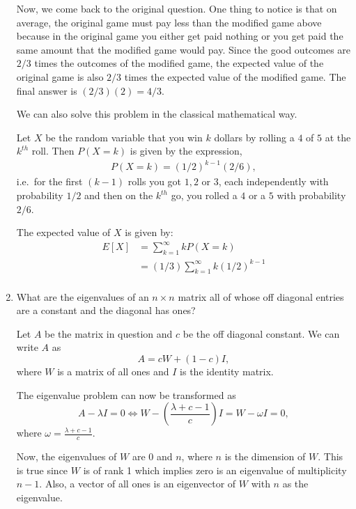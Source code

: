 \documentclass{amsart}
\theoremstyle{plain}
\numberwithin{equation}{section}
\begin{document}
\begin{enumerate}
Now, we come back to the original question. One thing to notice is
that on average, the original game must pay less than the modified 
game above because in the original game you either get paid nothing 
or you get paid the same amount that the modified game would pay. 
Since the good outcomes are $2/3$ times the outcomes of the 
modified game, the expected value of the original game is 
also $2/3$ times the expected value of the modified game.
The final answer is  $(2/3)(2) = 4/3$.

We can also solve this problem in the classical mathematical way.

Let $X$ be the random variable that you win $k$ dollars 
by rolling a $4$ of $5$ at the $k^{th}$ roll. Then 
$P(X=k)$ is given by the expression,
\begin{align*}
P(X=k) = (1/2)^{k-1}(2/6),
\end{align*}
i.e.\ for the first $(k-1)$ rolls you got $1,2$ or $3$, each independently 
with probability $1/2$ and then on the $k^{th}$ go, you rolled 
a $4$ or a $5$ with probability $2/6$.

The expected value of $X$ is given by:
\begin{align*}
E[X] &= \sum_{k=1}^{\infty} k P(X=k)\\
&= (1/3)\sum_{k=1}^{\infty} k (1/2)^{k-1}\\
\end{align*}

\item What are the eigenvalues of an $n \times n$ 
matrix all of whose off diagonal entries are 
a constant and the diagonal has ones?

Let $A$ be the matrix in question and 
$c$ be the off diagonal constant. We can write
$A$ as
\begin{equation}
A = cW + (1-c) I,
\end{equation}
where $W$ is a matrix of all ones and 
$I$ is the identity matrix. 

The eigenvalue problem can now be transformed as
\begin{equation}
A - \lambda I = 0 
\iff
W - \left(\frac{\lambda + c - 1}{c}\right) I  
= W - \omega I = 0,
\end{equation}
where $\omega = \frac{\lambda + c - 1}{c}$.

Now, the eigenvalues of $W$ are $0$ and $n$, where
$n$ is the dimension of $W$. This is true 
since $W$ is of rank 1 which implies zero is an 
eigenvalue of multiplicity $n-1$. Also, a vector of all ones 
is an eigenvector of $W$ with $n$ as the eigenvalue. 


\end{enumerate}
\end{document}
